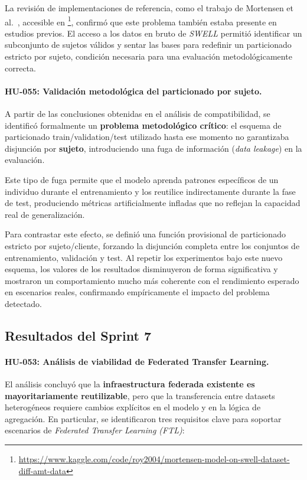 \documentclass{report}
\begin{document}
La revisión de implementaciones de referencia, como el trabajo de Mortensen et al.~\cite{Mortensen2023SWELL}, accesible en \footnote{\url{https://www.kaggle.com/code/roy2004/mortensen-model-on-swell-dataset-diff-amt-data}}, confirmó que este problema también estaba presente en estudios previos. El acceso a los datos en bruto de \textit{SWELL} permitió identificar un subconjunto de sujetos válidos y sentar las bases para redefinir un particionado estricto por sujeto, condición necesaria para una evaluación metodológicamente correcta.


\vspace{0.15em}
\paragraph{HU-055: Validación metodológica del particionado por sujeto.}
A partir de las conclusiones obtenidas en el análisis de compatibilidad, se identificó formalmente un \textbf{problema metodológico crítico}: el esquema de particionado train/validation/test utilizado hasta ese momento no garantizaba disjunción por \textbf{sujeto}, introduciendo una fuga de información (\emph{data leakage}) en la evaluación.

Este tipo de fuga permite que el modelo aprenda patrones específicos de un individuo durante el entrenamiento y los reutilice indirectamente durante la fase de test, produciendo métricas artificialmente infladas que no reflejan la capacidad real de generalización.

Para contrastar este efecto, se definió una función provisional de particionado estricto por sujeto/cliente, forzando la disjunción completa entre los conjuntos de entrenamiento, validación y test. Al repetir los experimentos bajo este nuevo esquema, los valores de los resultados disminuyeron de forma significativa y mostraron un comportamiento mucho más coherente con el rendimiento esperado en escenarios reales, confirmando empíricamente el impacto del problema detectado.


\subsection{Resultados del Sprint 7}

\paragraph{HU-053: Análisis de viabilidad de Federated Transfer Learning.}
El análisis concluyó que la \textbf{infraestructura federada existente es mayoritariamente reutilizable}, pero que la transferencia entre datasets heterogéneos requiere cambios explícitos en el modelo y en la lógica de agregación. En particular, se identificaron tres requisitos clave para soportar escenarios de \textit{Federated Transfer Learning (FTL)}:
\end{document}

